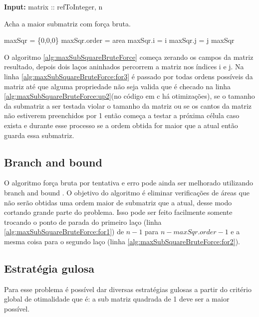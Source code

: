 \documentclass[10.9pt]{article}
\begin{document}
\begin{algorithm}
\textbf{Input:} matrix :: refToInteger, n
\caption{Acha a maior submatriz com força bruta.}\label{alg:maxSubSquareBruteForce}
\begin{algorithmic}[1]
    \State maxSqr = \{0,0,0\}
            \label{alg:maxSubSquareBruteForce:for1}
		\label{alg:maxSubSquareBruteForce:for2}
		\label{alg:maxSubSquareBruteForce:for3}
		\label{alg:maxSubSquareBruteForce:up2}
			\State maxSqr.order = area
			\State maxSqr.i = i
			\State maxSqr.j = j
			\EndIf
			\Else
			\Break
		    \EndIf
                \EndFor
		\EndFor
            \EndFor
	\State \Return maxSqr
  \EndProcedure
\end{algorithmic}
\end{algorithm}

O algoritmo \ref{alg:maxSubSquareBruteForce} começa zerando os campos da matriz resultado, depois dois laços aninhados percorrem a matriz nos índices i e j. Na linha \ref{alg:maxSubSquareBruteForce:for3} é passado por todas ordens possíveis da matriz até que alguma propriedade não seja valida que é checado na linha \ref{alg:maxSubSquareBruteForce:up2}(no código em c há otimizações), se o tamanho da submatriz a ser testada violar o tamanho da matriz ou se os cantos da matriz não estiverem preenchidos por 1 então começa a testar a próxima célula caso exista e durante esse processo se a ordem obtida for maior que a atual então guarda essa submatriz.

\subsection{Branch and bound}
\label{sec:org8305cfe}
O algoritmo força bruta por tentativa e erro pode ainda ser melhorado utilizando branch and bound \cite{Lawler1966}. O objetivo do algoritmo é eliminar verificações de áreas que não serão obtidas uma ordem maior de submatriz que a atual, desse modo cortando grande parte do problema. Isso pode ser feito facilmente somente trocando o ponto de parada do primeiro laço (linha \ref{alg:maxSubSquareBruteForce:for1}) de \(n-1\) para \(n-maxSqr.order-1\) e a mesma coisa para o segundo laço (linha \ref{alg:maxSubSquareBruteForce:for2}).
\subsection{Estratégia gulosa}
\label{sec:org556f2f5}
Para esse problema é possível dar diversas estratégias gulosas a partir do critério global de otimalidade que é: a sub matriz quadrada de 1 deve ser a maior possível. \cite{curtis03_class_greed_algor}
\end{document}
